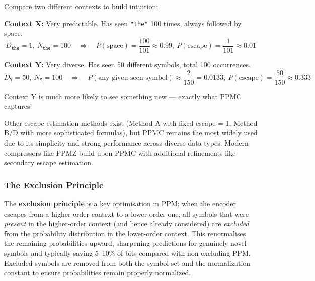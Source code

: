 \begin{examplebox}

Compare two different contexts to build intuition:

\textbf{Context X:} Very predictable. Has seen \texttt{"the"} 100 times, always
followed by space.
\[
D_{\texttt{the}} = 1,\ N_{\texttt{the}} = 100 \quad\Rightarrow\quad 
P(\text{space}) = \frac{100}{101} \approx 0.99,\ 
P(\text{escape}) = \frac{1}{101} \approx 0.01
\]

\textbf{Context Y:} Very diverse. Has seen 50 different symbols, total 100 occurrences.
\[
D_{\texttt{Y}} = 50,\ N_{\texttt{Y}} = 100 \quad\Rightarrow\quad 
P(\text{any given seen symbol}) \approx \frac{2}{150} = 0.0133,\ 
P(\text{escape}) = \frac{50}{150} \approx 0.333
\]

Context Y is much more likely to see something new — exactly what PPMC captures!
\end{examplebox}

\begin{importantbox}
Other escape estimation methods exist (Method A with fixed escape = 1, Method B/D with
more sophisticated formulas), but PPMC remains the most widely used due to its
simplicity and strong performance across diverse data types. Modern compressors like
PPMZ build upon PPMC with additional refinements like secondary escape estimation.
\end{importantbox}

\subsubsection{The Exclusion Principle}

\begin{importantbox}
The \textbf{exclusion principle} is a key optimisation in PPM: when the encoder
escapes from a higher-order context to a lower-order one, all symbols that were
\emph{present} in the higher-order context (and hence already considered) are
\emph{excluded} from the probability distribution in the lower-order context. This
renormalises the remaining probabilities upward, sharpening predictions for
genuinely novel symbols and typically saving 5--10\% of bits compared with
non-excluding PPM. Excluded symbols are removed from both the symbol set and the 
normalization constant to ensure probabilities remain properly normalized.
\end{importantbox}

